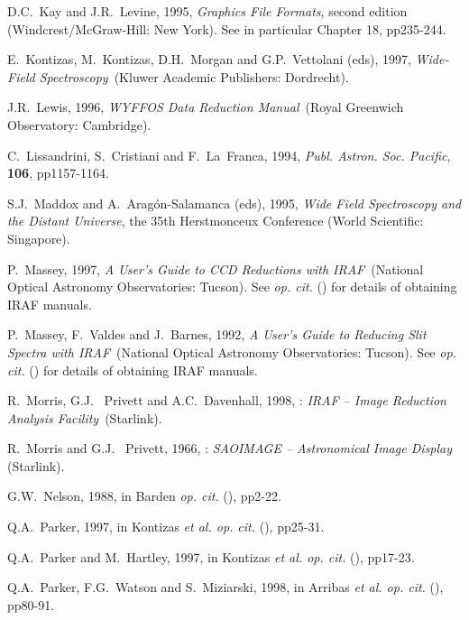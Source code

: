 \documentclass[twoside,11pt]{starlink}
\begin{document}
\begin{thebibliography}{99}
   D.C.~Kay and J.R.~Levine, 1995, \textit{Graphics File
   Formats}, second edition
  \newline (Windcrest/McGraw-Hill: New York).  See in particular
   Chapter 18, pp235-244.

   E.~Kontizas, M.~Kontizas, D.H.~Morgan and
   G.P.~Vettolani (eds), 1997, \textit{Wide-Field Spectroscopy}\,
   (Kluwer Academic Publishers: Dordrecht).

   J.R.~Lewis, 1996, \textit{WYFFOS Data Reduction
   Manual}\, (Royal Greenwich Observatory: Cambridge).

   C.~Lissandrini, S.~Cristiani and F.~La~Franca,
   1994, \textit{Publ. Astron. Soc. Pacific}, \textbf{106}, pp1157-1164.

   S.J.~Maddox and A.~Arag\'{o}n-Salamanca (eds),
   1995, \textit{Wide Field Spectroscopy and the Distant Universe},
   the 35th Herstmonceux Conference (World Scientific: Singapore).

   P.~Massey, 1997, \textit{A User's Guide to CCD
   Reductions with IRAF}\, (National Optical Astronomy Observatories:
   Tucson).  See  \textit{op. cit.}\/ (\cite{SG12})
   for details of obtaining IRAF manuals.

   P.~Massey, F.~Valdes and J.~Barnes, 1992, \textit{A User's Guide to Reducing Slit Spectra with IRAF}\, (National
   Optical Astronomy Observatories: Tucson).  See 
   \textit{op. cit.}\/ (\cite{SG12}) for details of obtaining IRAF manuals.

   R.~Morris, G.J.~ Privett and A.C.~Davenhall, 1998,
   : \textit{IRAF -- Image Reduction Analysis Facility}\,
   (Starlink).

   R.~Morris and G.J.~ Privett, 1966,
   : \textit{SAOIMAGE -- Astronomical Image Display}\,
   (Starlink).

   G.W.~Nelson, 1988, in Barden \textit{op. cit.}\/
   (\cite{BARDEN88}), pp2-22.

   Q.A.~Parker, 1997, in Kontizas \textit{et al. op.
   cit.}\/ (\cite{KONTIZAS97}), pp25-31.

   Q.A.~Parker and M.~Hartley, 1997, in Kontizas \textit{et al. op. cit.}\/ (\cite{KONTIZAS97}), pp17-23.

   Q.A.~Parker, F.G.~Watson and S.~Miziarski, 1998, in
   Arribas \textit{et al. op. cit.}\/ (\cite{ARRIBAS98}), pp80-91.


\end{thebibliography}
\end{document}
